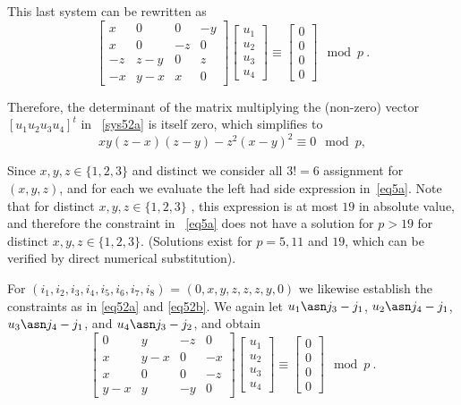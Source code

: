 This last system can be rewritten as
\begin{equation}\label{sys52a}
\left[ \begin{array}{ccccccc} x & 0 & 0 & -y\\
x & 0 & -z &0\\
-z & z-y &0 & z\\
-x & y-x & x & 0
\end{array}\right] \left[\begin{array}{c}
u_1\\u_2\\u_3\\u_4 \end{array}\right] \equiv
\left[\begin{array}{c}0\\0\\0\\0\end{array}\right] \mod p~.
\end{equation}

Therefore, the determinant of the matrix multiplying the
(non-zero) vector $\left[u_1 u_2 u_3 u_4\right]^{t}$ in
~\eqref{sys52a} is itself zero, which simplifies to
\begin{equation}\label{eq5a}
xy(z-x)(z-y)-z^2(x-y)^2 \equiv 0 \mod p,
\end{equation}

Since $x,y,z \in \{1,2,3\}$ and distinct we consider all $3!=6$
assignment for $(x,y,z)$, and for each we evaluate the left had side
expression in~\eqref{eq5a}. Note that for distinct $x,y,z \in
\{1,2,3\}$ , this expression is at most $19$ in absolute value, and
therefore the constraint in ~\eqref{eq5a} does not have a solution
for $p>19$ for distinct $x,y,z \in \{1,2,3\}$. (Solutions exist for
$p=5,11$ and $19$, which can be verified by direct numerical
substitution).

For $(i_1,i_2,i_3,i_4,i_5,i_6,i_7,i_8)$ = $(0,x,y,z,z,z,y,0)$ we
likewise establish the constraints as in \eqref{eq52a} and
\eqref{eq52b}. We again let $u_1 \asn j_3 -j_1$, $u_2\asn j_4
-j_1$, $u_3 \asn j_4 -j_1$, and $u_4 \asn j_3 -j_2$, and obtain
\begin{equation}\label{sys52b}
\left[ \begin{array}{ccccccc} 0 & y & -z & 0\\
x & y-x & 0 & -x\\
x & 0 &0 & -z\\
y-x & y & -y & 0
\end{array}\right] \left[\begin{array}{c}
u_1\\u_2\\u_3\\u_4 \end{array}\right] \equiv
\left[\begin{array}{c}0\\0\\0\\0\end{array}\right] \mod p~.
\end{equation}

